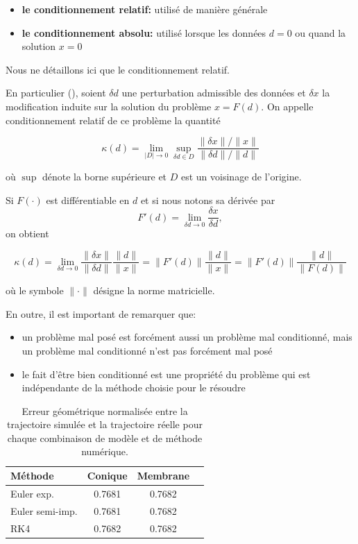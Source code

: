 \documentclass[
	a4paper, %
	10pt, %
	unnumberedsections, %
	twoside, %
]{LTJournalArticle}
\begin{document}
\begin{itemize}
    \item \textbf{le conditionnement relatif:} utilisé de manière générale
    \item \textbf{le conditionnement absolu:} utilisé lorsque les données $d = 0$ ou quand la solution $x = 0$
\end{itemize}

Nous ne détaillons ici que le conditionnement relatif.

En particulier (\cite{Marteen:2022}), soient $\delta d$ une perturbation admissible des données et $\delta x$ la
modification induite sur la solution du problème $x = F(d)$. On appelle
conditionnement relatif de ce problème la quantité

\begin{equation}
    \kappa(d) = \lim_{|D| \to 0} \sup_{\delta d \in D}
    \frac{\|\delta x\| / \|x\|}{\|\delta d\| / \|d\|}
\end{equation}

où $\sup$ dénote la borne supérieure et $D$ est un voisinage de l'origine.

Si $F(\cdot)$ est différentiable en $d$ et si nous notons sa dérivée par
\[
F'(d) = \lim_{\delta d \to 0} \frac{\delta x}{\delta d},
\]
on obtient

\begin{equation}
    \kappa(d) = \lim_{\delta d \to 0}
    \frac{\|\delta x\|}{\|\delta d\|}
    \frac{\|d\|}{\|x\|}
    = \|F'(d)\| \frac{\|d\|}{\|x\|}
    = \|F'(d)\| \frac{\|d\|}{\|F(d)\|}
\end{equation}

où le symbole $\|\cdot\|$ désigne la norme matricielle.

En outre, il est important de remarquer que:
\begin{itemize}
    \item un problème mal posé est forcément aussi un problème mal conditionné, mais un problème mal conditionné n'est pas forcément mal posé
    \item le fait d'être bien conditionné est une propriété du problème qui est indépendante de la méthode choisie pour le résoudre
\end{itemize}




\clearpage
\onecolumn

\begin{table}[htbp]
    \centering
    \small
    \caption{Erreur géométrique normalisée entre la trajectoire simulée et la trajectoire réelle pour chaque combinaison de modèle et de méthode numérique.}
    \label{tab:comparaison_methodes_modeles}
    \begin{tabular}{lccc}
        \toprule
        Méthode         & Conique & Membrane \\
        \midrule
        Euler exp.      & 0.7681  & 0.7682        \\
        Euler semi-imp. & 0.7681  & 0.7682        \\
        RK4             & 0.7682  & 0.7682        \\
        \bottomrule
    \end{tabular}
\end{table}
\end{document}
